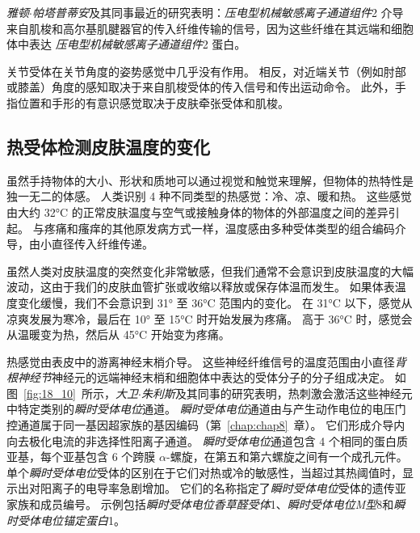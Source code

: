 \textit{雅顿$\cdot$帕塔普蒂安}及其同事最近的研究表明：\textit{压电型机械敏感离子通道组件}2 介导来自肌梭和高尔基肌腱器官的传入纤维传输的信号，因为这些纤维在其远端和细胞体中表达 \textit{压电型机械敏感离子通道组件}2 蛋白。


关节受体在关节角度的姿势感觉中几乎没有作用。
相反，对近端关节（例如肘部或膝盖）角度的感知取决于来自肌梭受体的传入信号和传出运动命令。
此外，手指位置和手形的有意识感觉取决于皮肤牵张受体和肌梭。



\subsection{热受体检测皮肤温度的变化}

虽然手持物体的大小、形状和质地可以通过视觉和触觉来理解，但物体的热特性是独一无二的体感。
人类识别 4 种不同类型的热感觉：冷、凉、暖和热。
这些感觉由大约 32°C 的正常皮肤温度与空气或接触身体的物体的外部温度之间的差异引起。
与疼痛和瘙痒的其他原发病方式一样，温度感由多种受体类型的组合编码介导，由小直径传入纤维传递。


虽然人类对皮肤温度的突然变化非常敏感，但我们通常不会意识到皮肤温度的大幅波动，这由于我们的皮肤血管扩张或收缩以释放或保存体温而发生。
如果体表温度变化缓慢，我们不会意识到 31° 至 36°C 范围内的变化。
在 31°C 以下，感觉从凉爽发展为寒冷，最后在 10° 至 15°C 时开始发展为疼痛。
高于 36°C 时，感觉会从温暖变为热，然后从 45°C 开始变为疼痛。


热感觉由表皮中的游离神经末梢介导。
这些神经纤维信号的温度范围由小直径\textit{背根神经节}神经元的远端神经末梢和细胞体中表达的受体分子的分子组成决定。
如图~\ref{fig:18_10}~所示，\textit{大卫$\cdot$朱利斯}及其同事的研究表明，热刺激会激活这些神经元中特定类别的\textit{瞬时受体电位}通道。
\textit{瞬时受体电位}通道由与产生动作电位的电压门控通道属于同一基因超家族的基因编码（第~\ref{chap:chap8}~章）。 
它们形成介导内向去极化电流的非选择性阳离子通道。
\textit{瞬时受体电位}通道包含 4 个相同的蛋白质亚基，每个亚基包含 6 个跨膜 $\alpha$-螺旋，在第五和第六螺旋之间有一个成孔元件。
单个\textit{瞬时受体电位}受体的区别在于它们对热或冷的敏感性，当超过其热阈值时，显示出对阳离子的电导率急剧增加。
它们的名称指定了\textit{瞬时受体电位}受体的遗传亚家族和成员编号。 
示例包括\textit{瞬时受体电位香草醛受体}1、\textit{瞬时受体电位M型}8和\textit{瞬时受体电位锚定蛋白}1。



